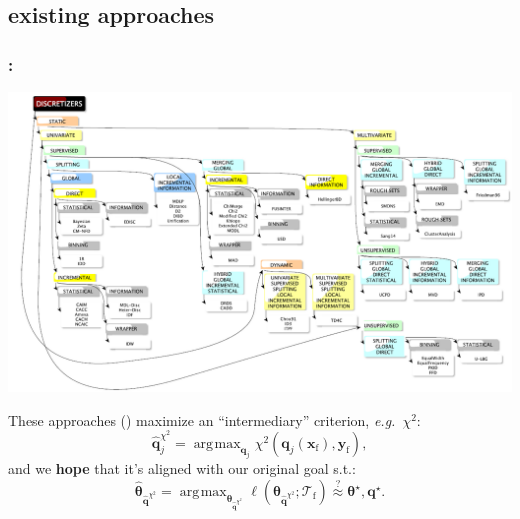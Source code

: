 \documentclass[english,xcolor={rgb,dvipsnames,table,usenames}]{beamer}
\DeclareMathOperator*{\argmax}{\arg\!\max}
\newcommand\q{{\bm{q}}}
\newcommand{\f}{\text{f}}
\begin{document}
\subsection{existing approaches}
\begin{frame}
\frametitle{\secname: \subsecname}

\vspace*{-0.25cm}
\begin{center}
\includegraphics[scale=0.3]{figures/taxonomy.PNG}
\end{center}
\vspace*{-0.2cm}
These approaches (\cite{wrapper2}) maximize an ``intermediary'' criterion, \textit{e.g.}\ $\chi^2$:
\vspace*{-0.1cm}
\[ \hat{\q}_j^{\chi^2} = \argmax_{\q_j} \chi^2(\q_j(\mathbf{x}_\text{f}), \mathbf{y}_\text{f}), \]
\vspace*{-0.1cm}
and we {\bf hope} that it's aligned with our original goal s.t.:
\vspace*{-0.1cm}
\[ \hat{\bm{\theta}}_{\hat{\q}^{\chi^2}} = \argmax_{\bm{\theta}_{\hat{\q}^{\chi^2}}} \ell(\bm{\theta}_{\hat{\q}^{\chi^2}} ; \mathcal{T}_\f) \stackrel{?}{\approx} \bm{\theta}^\star, \q^\star. \]

\end{frame}
\end{document}
